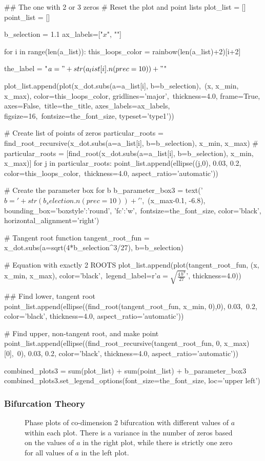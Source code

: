 \documentclass[10pt]{beamer}
\newcommand\TwoFigOneCap[4]{%
	\begin{figure}[hbt]
		\minipage[t]{0.48\textwidth}\centering
			{#1}
		\endminipage\hfill
		\minipage[t]{0.48\textwidth}\centering
			{#2}
		\endminipage
		\caption{#3}\label{#4}
	\end{figure}%
}
\begin{document}
\begin{sagesilent}
	## The one with 2 or 3 zeros
	# Reset the plot and point lists
	plot_list = []
	point_list = []

	b_selection = 1.1
	ax_labels=["$x$", ""]

	for i in range(len(a_list)):
	    this_loops_color = rainbow(len(a_list)+2)[i+2]

	    the_label = "$a = " + str(a_list[i].n(prec=10)) + "$"

	    plot_list.append(plot(x_dot.subs(a=a_list[i], b=b_selection),\
	    		(x, x_min, x_max), color=this_loops_color, gridlines='major',\
	    		thickness=4.0, frame=True, axes=False,\
	    		title=the_title, axes_labels=ax_labels, figsize=16,\
	    		fontsize=the_font_size, typeset='type1'))

	    # Create list of points of zeros
	    particular_roots = find_root_recursive(x_dot.subs(a=a_list[i], b=b_selection), x_min, x_max)
	#	particular_roots = [find_root(x_dot.subs(a=a_list[i], b=b_selection), x_min, x_max)]
	    for j in particular_roots:
	    	point_list.append(ellipse((j,0), 0.03, 0.2, color=this_loops_color,\
	    			thickness=4.0, aspect_ratio='automatic'))


	# Create the parameter box for b
	b_parameter_box3 = text('$b = ' + str(b_selection.n(prec=10)) + '$',\
			(x_max-0.1, -6.8), bounding_box={'boxstyle':'round', 'fc':'w'},\
			fontsize=the_font_size, color='black', horizontal_alignment='right')


	# Tangent root function
	tangent_root_fun = x_dot.subs(a=sqrt(4*b_selection^3/27), b=b_selection)

	# Equation with exactly 2 ROOTS
	plot_list.append(plot(tangent_root_fun, (x, x_min, x_max), color='black',\
			legend_label=r'$a = \sqrt{\frac{4\,b^3}{27}}$', thickness=4.0))

	## Find lower, tangent root
	point_list.append(ellipse((find_root(tangent_root_fun, x_min, 0),0), 0.03,\
			0.2, color='black', thickness=4.0, aspect_ratio='automatic'))

	# Find upper, non-tangent root, and make point
	point_list.append(ellipse((find_root_recursive(tangent_root_fun, 0, x_max)[0],\
			0), 0.03, 0.2, color='black', thickness=4.0, aspect_ratio='automatic'))

	combined_plots3 = sum(plot_list) + sum(point_list) + b_parameter_box3
	combined_plots3.set_legend_options(font_size=the_font_size, loc='upper left')

\end{sagesilent}
\begin{frame} %
\frametitle{Bifurcation Theory}
\TwoFigOneCap{\sageplot[width=1.0\textwidth]{combined_plots1}}
	{\sageplot[width=1.0\textwidth]{combined_plots3}}
	{Phase plots of co-dimension 2 bifurcation with different values of $a$ within each plot. %
	There is a variance in the number of zeros based on the values of $a$ in the right plot, while there is strictly one zero for all values of $a$ in the left plot.}
	{fig:stationaries_b}
\end{frame}
\end{document}
